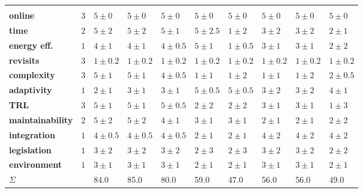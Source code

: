 {
\noindent
{}
\begin{longtabu}{X[7,r,m] X[1,cm] X[3,c,m] X[3,c,m] X[3,c,m] X[3,c,m] X[3,c,m] X[3,c,m] X[3,c,m] X[3,c,m]}
 \rowfont{\sffamily\bfseries\color{RoyalWhite}}
  \color{RoyalWhite} & \color{RoyalWhite}  & \color{RoyalWhite}  & \color{RoyalWhite}  & \color{RoyalWhite}  & \color{RoyalWhite}  & \color{RoyalWhite}  & \color{RoyalWhite}  & \color{RoyalWhite}  & \color{RoyalWhite} \\
  \textbf{online} & \(3\) & \(5 \pm 0\) & \(5 \pm 0\) & \(5 \pm 0\) & \(5 \pm 0\) & \(5 \pm 0\) & \(5 \pm 0\) & \(5 \pm 0\) & \(5 \pm 0\)\\
  \textbf{time} & \(2\) & \(5 \pm 2\) & \(5 \pm 2\) & \(5 \pm 1\) & \(5 \pm 2.5\) & \(1 \pm 2\) & \(3 \pm 2\) & \(3 \pm 2\) & \(2 \pm 1\)\\
  \textbf{energy eff.} & \(1\) & \(4 \pm 1\) & \(4 \pm 1\) & \(4 \pm 0.5\) & \(5 \pm 1\) & \(1 \pm 0.5\) & \(3 \pm 1\) & \(3 \pm 1\) & \(2 \pm 2\)\\
  \textbf{revisits} & \(3\) & \(1 \pm 0.2\) & \(1 \pm 0.2\) & \(1 \pm 0.2\) & \(1 \pm 0.2\) & \(1 \pm 0.2\) & \(1 \pm 0.2\) & \(1 \pm 0.2\) & \(1 \pm 0.2\)\\
  \textbf{complexity} & \(3\) & \(5 \pm 1\) & \(5 \pm 1\) & \(4 \pm 0.5\) & \(1 \pm 1\) & \(1 \pm 2\) & \(1 \pm 1\) & \(1 \pm 2\) & \(2 \pm 0.5\)\\
  \textbf{adaptivity} & \(1\) & \(2 \pm 1\) & \(3 \pm 1\) & \(3 \pm 1\) & \(5 \pm 0.5\) & \(5 \pm 0.5\) & \(3 \pm 2\) & \(3 \pm 2\) & \(4 \pm 1\)\\
  \textbf{TRL} & \(3\) & \(5 \pm 1\) & \(5 \pm 1\) & \(5 \pm 0.5\) & \(2 \pm 2\) & \(2 \pm 2\) & \(3 \pm 1\) & \(3 \pm 1\) & \(1 \pm 3\)\\
  \textbf{maintainability} & \(2\) & \(5 \pm 2\) & \(5 \pm 2\) & \(4 \pm 1\) & \(3 \pm 1\) & \(3 \pm 1\) & \(2 \pm 1\) & \(2 \pm 1\) & \(2 \pm 2\)\\
  \textbf{integration} & \(1\) & \(4 \pm 0.5\) & \(4 \pm 0.5\) & \(4 \pm 0.5\) & \(2 \pm 1\) & \(2 \pm 1\) & \(4 \pm 2\) & \(4 \pm 2\) & \(4 \pm 2\)\\
  \textbf{legislation} & \(1\) & \(3 \pm 2\) & \(3 \pm 2\) & \(3 \pm 2\) & \(2 \pm 3\) & \(2 \pm 3\) & \(3 \pm 2\) & \(3 \pm 2\) & \(2 \pm 2\)\\
  \textbf{environment} & \(1\) & \(3 \pm 1\) & \(3 \pm 1\) & \(3 \pm 1\) & \(2 \pm 1\) & \(2 \pm 1\) & \(3 \pm 1\) & \(3 \pm 1\) & \(2 \pm 1\)\\
 \rowfont{\sffamily\bfseries\color{RoyalWhite}}
  \color{RoyalWhite} \(\Sigma\) & &  \color{RoyalWhite} 84.0 &  \color{RoyalWhite} 85.0 &  \color{RoyalWhite} 80.0 &  \color{RoyalWhite} 59.0 &  \color{RoyalWhite} 47.0 &  \color{RoyalWhite} 56.0 &  \color{RoyalWhite} 56.0 &  \color{RoyalWhite} 49.0 
\end{longtabu}
}
